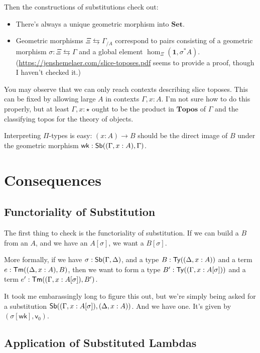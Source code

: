 \documentclass{article}
\begin{document}
Then the constructions of substitutions check out:
\begin{itemize}
    \item There's always a unique geometric morphism into \(\mathbf{Set}\).
    \item Geometric morphisms \(\Xi \leftrightarrows \Gamma_{/A}\) correspond to pairs consisting of a geometric morphism \(\sigma : \Xi \leftrightarrows \Gamma\) and a global element \(\hom_\Xi(\mathbf{1},\sigma^*A)\).
    (\url{https://jenshemelaer.com/slice-toposes.pdf} seems to provide a proof, though I haven't checked it.)
\end{itemize}

You may observe that we can only reach contexts describing slice toposes.
This can be fixed by allowing large \(A\) in contexts \(\Gamma, x : A\).
I'm not sure how to do this properly, but at least \(\Gamma, x : \star\) ought to be the product in \(\mathbf{Topos}\)
of \(\Gamma\) and the classifying topos for the theory of objects.

Interpreting \(\Pi\)-types is easy: \((x : A) \to B\) should be the direct image of \(B\) under the geometric morphism \(\mathsf{wk} : \mathsf{Sb}((\Gamma, x : A),\Gamma)\).

\section{Consequences}

\subsection{Functoriality of Substitution}

The first thing to check is the functoriality of substitution.
If we can build a \(B\) from an \(A\), and we have an \(A[\sigma]\), we want a \(B[\sigma]\).

More formally, if we have \(\sigma : \mathsf{Sb}(\Gamma,\Delta)\),
and a type \(B : \mathsf{Ty}((\Delta, x : A))\) and a term \(e : \mathsf{Tm}((\Delta, x : A), B)\),
then we want to form a type \(B' : \mathsf{Ty}((\Gamma, x : A[\sigma]))\)
and a term \(e' : \mathsf{Tm}((\Gamma, x : A[\sigma]), B')\).

It took me embarassingly long to figure this out, but we're simply being asked for a substitution
\(\mathsf{Sb}((\Gamma, x : A[\sigma]), (\Delta, x : A))\).
And we have one. It's given by \((\sigma[\mathsf{wk}],\mathsf{v}_0)\).

\subsection{Application of Substituted Lambdas}
\end{document}
